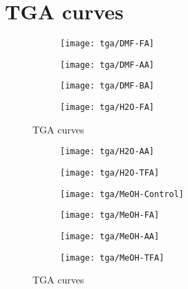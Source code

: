 
\section{TGA curves}

\begin{figure}[htbp]
    \centering

    \begin{subfigure}{0.45\linewidth}
        \texttt{[image: tga/DMF-FA]}%
        \label{appx:def:fgr:dmf-fa}
    \end{subfigure}
    \begin{subfigure}{0.45\linewidth}
        \texttt{[image: tga/DMF-AA]}%
        \label{appx:def:fgr:dmf-aa}
    \end{subfigure}

    
    \begin{subfigure}{0.45\linewidth}
        \texttt{[image: tga/DMF-BA]}%
        \label{appx:def:fgr:dmf-ba}
    \end{subfigure}
    \begin{subfigure}{0.45\linewidth}
        \texttt{[image: tga/H2O-FA]}%
        \label{appx:def:fgr:h2o-fa}
    \end{subfigure}

    \caption{TGA curves}
    
\end{figure}
\begin{figure}[htb]\ContinuedFloat{}

    \begin{subfigure}{0.45\linewidth}
        \texttt{[image: tga/H2O-AA]}%
        \label{appx:def:fgr:h2o-aa}
    \end{subfigure}
    \begin{subfigure}{0.45\linewidth}
        \texttt{[image: tga/H2O-TFA]}%
        \label{appx:def:fgr:h2o-tfa}
    \end{subfigure}

    \begin{subfigure}{0.45\linewidth}
        \texttt{[image: tga/MeOH-Control]}%
        \label{appx:def:fgr:meoh-cont}
    \end{subfigure}
    \begin{subfigure}{0.45\linewidth}
        \texttt{[image: tga/MeOH-FA]}%
        \label{appx:def:fgr:meoh-fa}
    \end{subfigure}

    \begin{subfigure}{0.45\linewidth}
        \texttt{[image: tga/MeOH-AA]}%
        \label{appx:def:fgr:meoh-aa}
    \end{subfigure}
    \begin{subfigure}{0.45\linewidth}
        \texttt{[image: tga/MeOH-TFA]}%
        \label{appx:def:fgr:meoh-tfa}
    \end{subfigure}

    \caption{TGA curves}%
    \label{appx:def:fgr:calomil100}
\end{figure}

